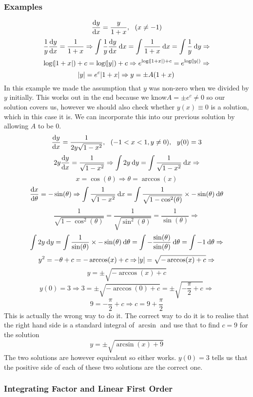 \documentclass[12pt]{report}
\begin{document}
\begin{flushleft}
\subsubsection*{Examples}
\[\frac{\mathrm{d}y}{\mathrm{d}x} = \frac{y}{1 + x}, \:\:\:(x\neq -1)\]
\[\frac{1}{y}\frac{\mathrm{d}y}{\mathrm{d}x} = \frac{1}{1 + x} \Rightarrow
\int\frac{1}{y}\frac{\mathrm{d}y}{\mathrm{d}x}\:\mathrm{d}x = \int\frac{1}{1 + x}\:\mathrm{d}x = \int\frac{1}{y}\:\mathrm{d}y
\Rightarrow\]
\[\log(\abs{1 + x}) + c = \log(\abs{y}) + c \Rightarrow 
e^{\log(\abs{1 + x}) + c} = e^{\log(\abs{y})} \Rightarrow\]
\[\abs{y} = e^c\abs{1 + x} \Rightarrow y = \pm A(1 + x)\]
In this example we made the assumption that \(y\) was non-zero when we divided
by \(y\) initially. This works out in the end because we know\(A=\pm e^c\neq0\)
so our solution covers us, however we should also check whether \(y(x)\equiv0\)
is a solution, which in this case it is. We can incorporate this into our
previous solution by allowing \(A\) to be \(0\).
\[\frac{\mathrm{d}y}{\mathrm{d}x} = \frac{1}{2y\sqrt{1 - x^2}}, \:\:\:(-1 < x < 1,y\neq 0), \:\:\: y(0)=3\]
\[2y\frac{\mathrm{d}y}{\mathrm{d}x} = \frac{1}{\sqrt{1 - x^2}} \Rightarrow\int2y\:\mathrm{d}y 
= \int\frac{1}{\sqrt{1 - x^2}}\:\mathrm{d}x \Rightarrow\]
\[x = \cos(\theta) \Rightarrow \theta = \arccos(x)\]
\[\frac{\mathrm{d}x}{\mathrm{d}\theta} = -\sin(\theta) \Rightarrow \int\frac{1}{\sqrt{1 - x^2}}\:\mathrm{d}x
= \int\frac{1}{\sqrt{1-\cos^2(\theta)}}\times-\sin(\theta)\:\mathrm{d}\theta\]
\[\frac{1}{\sqrt{1 - \cos^2(\theta)}} = \frac{1}{\sqrt{\sin^2(\theta)}} 
= \frac{1}{\sin(\theta)} \Rightarrow\]
\[\int2y\:\mathrm{d}y = \int\frac{1}{\sin(\theta)}\times-\sin(\theta)\:\mathrm{d}\theta
= \int -\frac{\sin(\theta)}{\sin(\theta)}\:\mathrm{d}\theta 
= \int-1\:\mathrm{d}\theta \Rightarrow\]
\[y^2 = -\theta + c = -\arccos(x) + c \Rightarrow \abs{y} 
= \sqrt{-\arccos(x) + c} \Rightarrow\]
\[y = \pm\sqrt{-\arccos(x) + c}\]
\[y(0) = 3 \Rightarrow 3 = \pm\sqrt{-\arccos(0) + c} 
= \pm\sqrt{-\frac{\pi}{2} + c} \Rightarrow\]
\[9 = -\frac{\pi}{2} + c \Rightarrow c = 9 + \frac{\pi}{2}\]
This is actually the wrong way to do it. The correct way to do it is to realise
that the right hand side is a standard integral of \(\arcsin\) and use that to
find \(c = 9\) for the solution
\[y = \pm\sqrt{\arcsin(x) + 9}\]
The two solutions are however equivalent so either works. \(y(0) = 3\) tells
us that the positive side of each of these two solutions are the correct one.

\subsubsection*{Integrating Factor and Linear First Order}


\end{flushleft}
\end{document}
